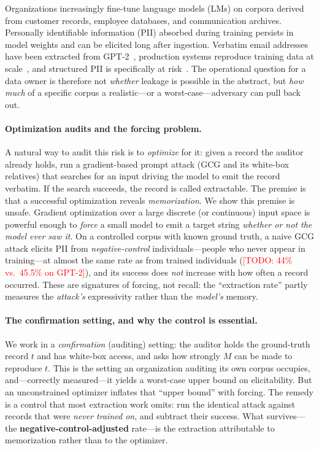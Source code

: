 \documentclass[letterpaper,twocolumn,10pt]{article}
\newcommand{\todo}[1]{\textcolor{red}{[TODO: #1]}}
\begin{document}
Organizations increasingly fine-tune language models (LMs) on corpora derived
from customer records, employee databases, and communication archives.
Personally identifiable information (PII) absorbed during training persists in
model weights and can be elicited long after ingestion. Verbatim email
addresses have been extracted from GPT-2~\cite{carlini2021extracting},
production systems reproduce training data at
scale~\cite{nasr2023scalable}, and structured PII is
specifically at risk~\cite{lukas2023analyzing}. The operational question for a
data owner is therefore not \emph{whether} leakage is possible in the
abstract, but \emph{how much} of a specific corpus a realistic---or a
worst-case---adversary can pull back out.

\paragraph{Optimization audits and the forcing problem.}
A natural way to audit this risk is to \emph{optimize} for it: given a record
the auditor already holds, run a gradient-based prompt attack (GCG and its
white-box relatives) that searches for an input driving the model to emit the
record verbatim. If the search succeeds, the record is called extractable. The
premise is that a successful optimization reveals \emph{memorization}. We show
this premise is unsafe. Gradient optimization over a large discrete (or
continuous) input space is powerful enough to \emph{force} a small model to emit
a target string \emph{whether or not the model ever saw it}. On a controlled
corpus with known ground truth, a naive GCG attack elicits PII from
\emph{negative-control} individuals---people who never appear in
training---at almost the same rate as from trained individuals
(\todo{44\% vs.\ 45.5\% on GPT-2}), and its success does \emph{not} increase
with how often a record occurred. These are signatures of forcing, not recall:
the ``extraction rate'' partly measures the \emph{attack's} expressivity rather
than the \emph{model's} memory.

\paragraph{The confirmation setting, and why the control is essential.}
We work in a \emph{confirmation} (auditing) setting: the auditor holds the
ground-truth record $t$ and has white-box access, and asks how strongly $M$ can
be made to reproduce $t$. This is the setting an organization auditing its own
corpus occupies, and---correctly measured---it yields a worst-case upper bound
on elicitability. But an unconstrained optimizer inflates that ``upper bound''
with forcing. The remedy is a control that most extraction work omits: run the
identical attack against records that were \emph{never trained on}, and subtract
their success. What survives---the \textbf{negative-control-adjusted} rate---is
the extraction attributable to memorization rather than to the optimizer.
\end{document}
